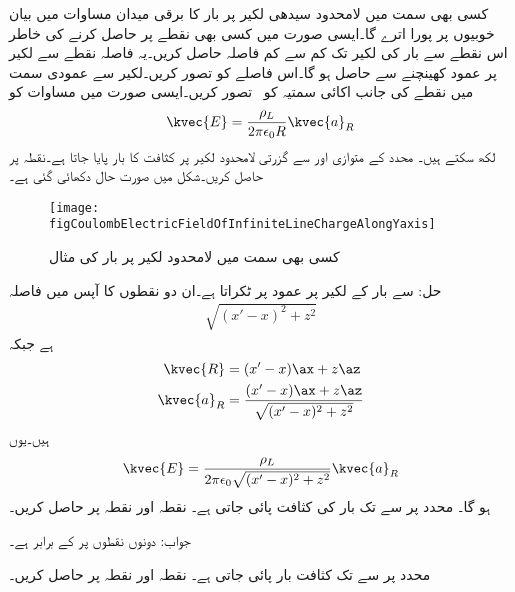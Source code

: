 کسی بھی سمت میں لامحدود سیدھی لکیر پر بار کا برقی میدان مساوات  میں بیان خوبیوں پر پورا اترے گا۔ایسی صورت میں کسی بھی نقطے پر  حاصل کرنے کی خاطر اس نقطے سے بار کی لکیر تک کم سے کم فاصلہ  حاصل کریں۔یہ فاصلہ نقطے سے لکیر پر عمود کھینچنے سے حاصل ہو گا۔اس فاصلے کو  تصور کریں۔لکیر سے عمودی سمت میں نقطے کی جانب اکائی سمتیہ  کو \arho   \, تصور کریں۔ایسی صورت میں مساوات  کو
\begin{align}\label{مساوات_کولمب_کسی_ بھی_سمت_میں_لامحدود_لکیر_رداسی_میدان_پیدا_کرتا_ہے}
\kvec{E}=\frac{\rho_L }{2 \pi \epsilon_0 R} \kvec{a}_R
\end{align}
لکھ سکتے ہیں۔
 محدد کے  متوازی اور  سے گزرتی لامحدود لکیر پر  کثافت کا بار پایا جاتا ہے۔نقطہ  پر  حاصل کریں۔شکل  میں صورت حال دکھائی گئی ہے۔
\begin{figure}
\centering
\texttt{[image: figCoulombElectricFieldOfInfiniteLineChargeAlongYaxis]}
\caption{کسی بھی سمت میں لامحدود لکیر پر بار کی مثال}
\label{شکل_کولمب_کسی_بھی_سمت_لامحدود_لکیر_پر_بار_کا_میدان}
\end{figure}

حل: سے بار کے لکیر پر عمود  پر ٹکراتا ہے۔ان دو نقطوں کا آپس میں فاصلہ
\begin{align*}
\sqrt{(x'-x)^2+z^2}
\end{align*}
ہے جبکہ 
\begin{align*}
\kvec{R}&=(x'-x)\ax+z\az\\
\kvec{a}_R&=\frac{(x'-x)\ax+z\az}{\sqrt{(x'-x)^2+z^2}}
\end{align*}
ہیں۔یوں
\begin{align*}
\kvec{E}=\frac{\rho_L}{2 \pi \epsilon_0 \sqrt{(x'-x)^2+z^2}} \kvec{a}_R
\end{align*}
ہو گا۔
 محدد پر  سے  تک  بار کی کثافت پائی جاتی ہے۔ نقطہ  اور نقطہ    پر  حاصل کریں۔

جواب: دونوں نقطوں پر  کے برابر ہے۔

 محدد پر  سے  تک  کثافت بار پائی جاتی ہے۔ نقطہ  اور نقطہ    پر  حاصل کریں۔

